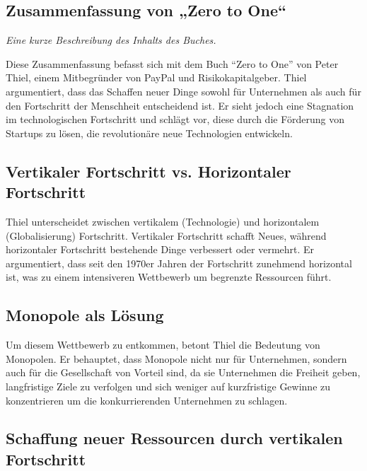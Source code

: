 \documentclass[10pt]{article}
\begin{document}
\tableofcontents
\newpage


\begin{center}
\section*{Zusammenfassung von „Zero to One“}
\textit{Eine kurze Beschreibung des Inhalts des Buches.}
\end{center}

Diese Zusammenfassung befasst sich mit dem Buch ``Zero to One'' von Peter Thiel, einem Mitbegründer von PayPal und Risikokapitalgeber. Thiel argumentiert, dass das Schaffen neuer Dinge sowohl für Unternehmen als auch für den Fortschritt der Menschheit entscheidend ist. Er sieht jedoch eine Stagnation im technologischen Fortschritt und schlägt vor, diese durch die Förderung von Startups zu lösen, die revolutionäre neue Technologien entwickeln.

\subsection*{Vertikaler Fortschritt vs. Horizontaler Fortschritt}

Thiel unterscheidet zwischen vertikalem (Technologie) und horizontalem (Globalisierung) Fortschritt. Vertikaler Fortschritt schafft Neues, während horizontaler Fortschritt bestehende Dinge verbessert oder vermehrt. Er argumentiert, dass seit den 1970er Jahren der Fortschritt zunehmend horizontal ist, was zu einem intensiveren Wettbewerb um begrenzte Ressourcen führt.

\subsection*{Monopole als Lösung}

Um diesem Wettbewerb zu entkommen, betont Thiel die Bedeutung von Monopolen. Er behauptet, dass Monopole nicht nur für Unternehmen, sondern auch für die Gesellschaft von Vorteil sind, da sie Unternehmen die Freiheit geben, langfristige Ziele zu verfolgen und sich weniger auf kurzfristige Gewinne zu konzentrieren um die konkurrierenden Unternehmen zu schlagen.

\subsection*{Schaffung neuer Ressourcen durch vertikalen Fortschritt}
\end{document}
